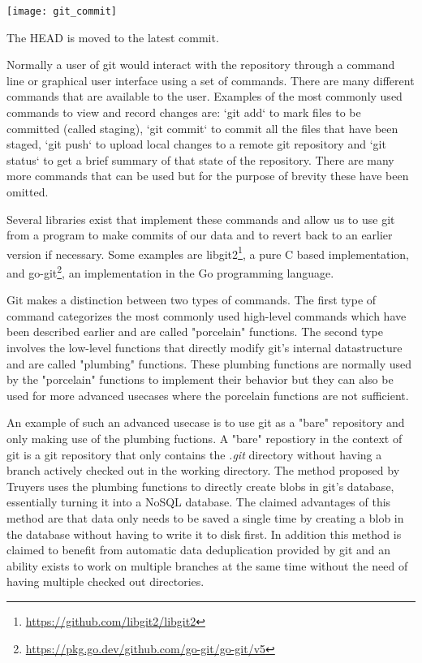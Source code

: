 \begin{marginfigure}
	\centering
	\texttt{[image: git\_commit]}
	\caption{The HEAD is moved to the latest commit.}
	\label{fig:gitcommit}
\end{marginfigure}

Normally a user of git would interact with the repository through a command line or graphical user interface using a set of commands.
There are many different commands that are available to the user.
Examples of the most commonly used commands to view and record changes are: `git add` to mark files to be committed (called staging), `git commit` to commit all the files that have been staged, `git push` to upload local changes to a remote git repository and `git status` to get a brief summary of that state of the repository. There are many more commands that can be used but for the purpose of brevity these have been omitted.

Several libraries exist that implement these commands and allow us to use git from a program to make commits of our data and to revert back to an earlier version if necessary.
Some examples are libgit2\footnote{\url{https://github.com/libgit2/libgit2}}, a pure C based implementation, and go-git\footnote{\url{https://pkg.go.dev/github.com/go-git/go-git/v5}}, an implementation in the Go programming language.

Git makes a distinction between two types of commands.
The first type of command categorizes the most commonly used high-level commands which have been described earlier and are called "porcelain" functions.
The second type involves the low-level functions that directly modify git's internal datastructure and are called "plumbing" functions.
These plumbing functions are normally used by the "porcelain" functions to implement their behavior but they can also be used for more advanced usecases where the porcelain functions are not sufficient.

An example of such an advanced usecase is to use git as a "bare" repository and only making use of the plumbing fuctions.
A "bare" repostiory in the context of git is a git repository that only contains the \textit{.git} directory without having a branch actively checked out in the working directory.
The method proposed by Truyers\cite{truyers_git_2016} uses the plumbing functions to directly create blobs in git's database, essentially turning it into a NoSQL database.
The claimed advantages of this method are that data only needs to be saved a single time by creating a blob in the database without having to write it to disk first.
In addition this method is claimed to benefit from automatic data deduplication provided by git and an ability exists to work on multiple branches at the same time without the need of having multiple checked out directories.

